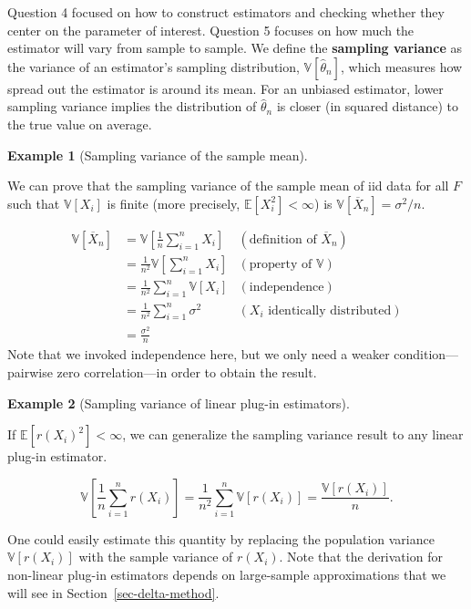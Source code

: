 \documentclass[
  13pt,
  letterpaper,
  DIV=11,
  numbers=noendperiod]{scrreprt}
\newcommand{\E}{\mathbb{E}}
\newcommand{\V}{\mathbb{V}}
\newcommand{\Xbar}{\overline{X}}
\theoremstyle{plain}
\theoremstyle{plain}
\theoremstyle{definition}
\theoremstyle{definition}
\newtheorem{example}{Example}[chapter]
\theoremstyle{remark}
\begin{document}
Question 4 focused on how to construct estimators and checking whether
they center on the parameter of interest. Question 5 focuses on how much
the estimator will vary from sample to sample. We define the
\textbf{sampling variance} as the variance of an estimator's sampling
distribution, \(\V[\widehat{\theta}_n]\), which measures how spread out
the estimator is around its mean. For an unbiased estimator, lower
sampling variance implies the distribution of \(\widehat{\theta}_n\) is
closer (in squared distance) to the true value on average.

\begin{example}[Sampling variance of the sample
mean]\protect\hypertarget{exm-mean-var}{}\label{exm-mean-var}

We can prove that the sampling variance of the sample mean of iid data
for all \(F\) such that \(\V[X_i]\) is finite (more precisely,
\(\E[X_i^2] < \infty\)) is \(\V[\Xbar_n] = \sigma^2/n\).

\[\begin{aligned}
  \V\left[ \Xbar_n \right] &= \V\left[ \frac{1}{n} \sum_{i=1}^n X_i \right] & (\text{definition of } \Xbar_n) \\
                           &= \frac{1}{n^2} \V\left[ \sum_{i=1}^n X_i \right] & (\text{property of } \V) \\
                           &= \frac{1}{n^2} \sum_{i=1}^n \V[X_i] & (\text{independence}) \\
                           &= \frac{1}{n^2} \sum_{i=1}^n \sigma^2 & (X_i \text{ identically distributed}) \\
                           &= \frac{\sigma^2}{n}
\end{aligned}\] Note that we invoked independence here, but we only need
a weaker condition---pairwise zero correlation---in order to obtain the
result.

\end{example}

\begin{example}[Sampling variance of linear plug-in
estimators]\protect\hypertarget{exm-linear-plugin-var}{}\label{exm-linear-plugin-var}

If \(\E[r(X_i)^2] < \infty\), we can generalize the sampling variance
result to any linear plug-in estimator.

\[
\V\left[\frac{1}{n} \sum_{i=1}^n r(X_i)\right] = \frac{1}{n^2} \sum_{i=1}^n \V[r(X_i)] = \frac{\V[r(X_i)]}{n}.
\]

One could easily estimate this quantity by replacing the population
variance \(\V[r(X_i)]\) with the sample variance of \(r(X_i)\). Note
that the derivation for non-linear plug-in estimators depends on
large-sample approximations that we will see in
Section~\ref{sec-delta-method}.

\end{example}
\end{document}
